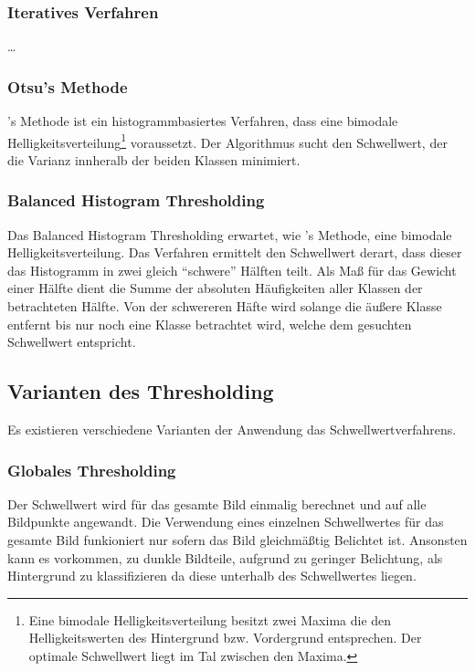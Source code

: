 \subsubsection*{Iteratives Verfahren}
\ldots
{}

\subsubsection*{Otsu's Methode}
's Methode ist ein histogrammbasiertes Verfahren, dass eine bimodale Helligkeitsverteilung\footnote{Eine bimodale Helligkeitsverteilung besitzt zwei Maxima die den Helligkeitswerten des Hintergrund bzw. Vordergrund entsprechen. Der optimale Schwellwert liegt im Tal zwischen den Maxima.} voraussetzt.
Der Algorithmus sucht den Schwellwert, der die Varianz innheralb der beiden Klassen minimiert.

\subsubsection*{Balanced Histogram Thresholding}
Das Balanced Histogram Thresholding erwartet, wie 's Methode, eine bimodale Helligkeitsverteilung.
Das Verfahren ermittelt den Schwellwert derart, dass dieser das Histogramm in zwei gleich "`schwere"' Hälften teilt.
Als Maß für das Gewicht einer Hälfte dient die Summe der absoluten Häufigkeiten aller Klassen der betrachteten Hälfte.
Von der schwereren Häfte wird solange die äußere Klasse entfernt bis nur noch eine Klasse betrachtet wird, welche dem gesuchten Schwellwert entspricht.

\subsection*{Varianten des Thresholding}
Es existieren verschiedene Varianten der Anwendung das Schwellwertverfahrens.

\subsubsection*{Globales Thresholding}
Der Schwellwert wird für das gesamte Bild einmalig berechnet und auf alle Bildpunkte angewandt.
Die Verwendung eines einzelnen Schwellwertes für das gesamte Bild funkioniert nur sofern das Bild gleichmäßtig Belichtet ist.
Ansonsten kann es vorkommen, zu dunkle Bildteile, aufgrund zu geringer Belichtung, als Hintergrund zu klassifizieren da diese unterhalb des Schwellwertes liegen.

